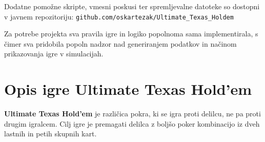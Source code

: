 \documentclass[a4paper,12pt]{article}
\begin{document}
Dodatne pomožne skripte, vmesni poskusi ter spremljevalne datoteke so dostopni v javnem repozitoriju:
\texttt{github.com/oskartezak/Ultimate\_Texas\_Holdem}

Za potrebe projekta sva pravila igre in logiko popolnoma sama implementirala, 
s čimer sva pridobila popoln nadzor nad generiranjem podatkov in načinom 
prikazovanja igre v simulacijah.

\section{Opis igre Ultimate Texas Hold'em} 



\textbf{Ultimate Texas Hold'em} je različica pokra, ki se igra proti delilcu, 
ne pa proti drugim igralcem. Cilj igre je premagati delilca z boljšo 
poker kombinacijo iz dveh lastnih in petih skupnih kart.
\end{document}
